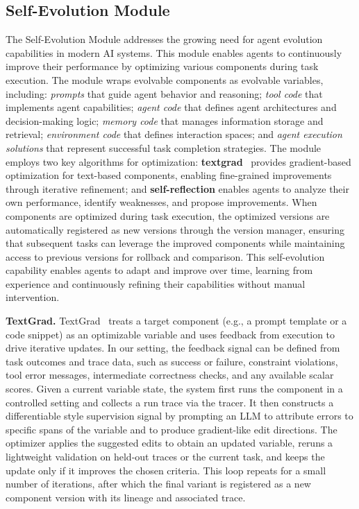 \documentclass[11pt]{article}
\begin{document}
\subsection{Self-Evolution Module}
The Self-Evolution Module addresses the growing need for agent evolution capabilities in modern AI systems. This module enables agents to continuously improve their performance by optimizing various components during task execution. The module wraps evolvable components as evolvable variables, including: \textit{prompts} that guide agent behavior and reasoning; \textit{tool code} that implements agent capabilities; \textit{agent code} that defines agent architectures and decision-making logic; \textit{memory code} that manages information storage and retrieval; \textit{environment code} that defines interaction spaces; and \textit{agent execution solutions} that represent successful task completion strategies. The module employs two key algorithms for optimization: \textbf{textgrad}~\citep{yuksekgonul2025optimizing} provides gradient-based optimization for text-based components, enabling fine-grained improvements through iterative refinement; and \textbf{self-reflection} enables agents to analyze their own performance, identify weaknesses, and propose improvements. When components are optimized during task execution, the optimized versions are automatically registered as new versions through the version manager, ensuring that subsequent tasks can leverage the improved components while maintaining access to previous versions for rollback and comparison. This self-evolution capability enables agents to adapt and improve over time, learning from experience and continuously refining their capabilities without manual intervention.

\textbf{TextGrad.} TextGrad~\citep{yuksekgonul2025optimizing} treats a target component (e.g., a prompt template or a code snippet) as an optimizable variable and uses feedback from execution to drive iterative updates. In our setting, the feedback signal can be defined from task outcomes and trace data, such as success or failure, constraint violations, tool error messages, intermediate correctness checks, and any available scalar scores. Given a current variable state, the system first runs the component in a controlled setting and collects a run trace via the tracer. It then constructs a differentiable style supervision signal by prompting an LLM to attribute errors to specific spans of the variable and to produce gradient-like edit directions. The optimizer applies the suggested edits to obtain an updated variable, reruns a lightweight validation on held-out traces or the current task, and keeps the update only if it improves the chosen criteria. This loop repeats for a small number of iterations, after which the final variant is registered as a new component version with its lineage and associated trace.
\end{document}
